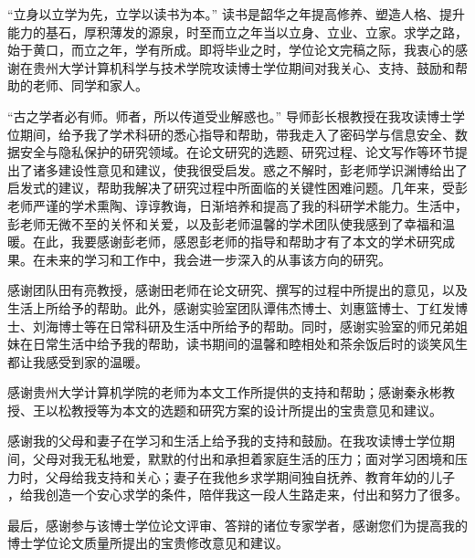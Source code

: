 \begin{thanks}
	
``立身以立学为先，立学以读书为本。'' 读书是韶华之年提高修养、塑造人格、提升能力的基石，厚积薄发的源泉，时至而立之年当以立身、立业、立家。求学之路，始于黄口，而立之年，学有所成。即将毕业之时，学位论文完稿之际，我衷心的感谢在贵州大学计算机科学与技术学院攻读博士学位期间对我关心、支持、鼓励和帮助的老师、同学和家人。

``古之学者必有师。师者，所以传道受业解惑也。'' 导师彭长根教授在我攻读博士学位期间，给予我了学术科研的悉心指导和帮助，带我走入了密码学与信息安全、数据安全与隐私保护的研究领域。在论文研究的选题、研究过程、论文写作等环节提出了诸多建设性意见和建议，使我很受启发。惑之不解时，彭老师学识渊博给出了启发式的建议，帮助我解决了研究过程中所面临的关键性困难问题。几年来，受彭老师严谨的学术熏陶、谆谆教诲，日渐培养和提高了我的科研学术能力。生活中，彭老师无微不至的关怀和关爱，以及彭老师温馨的学术团队使我感到了幸福和温暖。在此，我要感谢彭老师，感恩彭老师的指导和帮助才有了本文的学术研究成果。在未来的学习和工作中，我会进一步深入的从事该方向的研究。


感谢团队田有亮教授，感谢田老师在论文研究、撰写的过程中所提出的意见，以及生活上所给予的帮助。此外，感谢实验室团队谭伟杰博士、刘惠篮博士、丁红发博士、刘海博士等在日常科研及生活中所给予的帮助。同时，感谢实验室的师兄弟姐妹在日常生活中给予我的帮助，读书期间的温馨和睦相处和茶余饭后时的谈笑风生都让我感受到家的温暖。


感谢贵州大学计算机学院的老师为本文工作所提供的支持和帮助；感谢秦永彬教授、王以松教授等为本文的选题和研究方案的设计所提出的宝贵意见和建议。

感谢我的父母和妻子在学习和生活上给予我的支持和鼓励。在我攻读博士学位期间，父母对我无私地爱，默默的付出和承担着家庭生活的压力；面对学习困境和压力时，父母给我支持和关心；妻子在我他乡求学期间独自抚养、教育年幼的儿子
，给我创造一个安心求学的条件，陪伴我这一段人生路走来，付出和努力了很多。

最后，感谢参与该博士学位论文评审、答辩的诸位专家学者，感谢您们为提高我的博士学位论文质量所提出的宝贵修改意见和建议。
	
	
\end{thanks}
